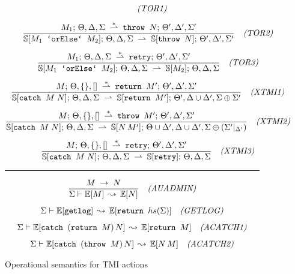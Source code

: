 \begin{figure*}
{\begin{minipage}{\textwidth}
\begin{gather*}
    \quad\soslbl{TOR1}
\\[5pt]
\sos{M_1;\,\Theta,\Delta\new{,\Sigma} \stackrel{*}{\tddarrow} 
      \prg{throw }N;\,\Theta',\Delta'\new{,\Sigma'}}
      {\SS[M_1 \prg{ `orElse` } M_2];\,\Theta,\Delta\new{,\Sigma} \tddarrow 
      \SS[\prg{throw }N];\,\Theta',\Delta'\new{,\Sigma'}} 
    \quad\soslbl{TOR2}
\\[5pt]
\sos{M_1;\,\Theta,\Delta\new{,\Sigma} \stackrel{*}{\tddarrow} 
      \prg{retry};\,\Theta',\Delta'\new{,\Sigma'}}
      {\SS[M_1 \prg{ `orElse` } M_2];\,\Theta,\Delta\new{,\Sigma} \tddarrow 
      \SS[M_2];\,\Theta,\Delta\new{,\Sigma}} 
    \quad\soslbl{TOR3}
\\[5pt]
%
%
\sos{M;\,\Theta,\emptyset\new{,[]}
     \stackrel{*}{\tddarrow}
     \prg{return }M';\, \Theta', \Delta'\new{,\Sigma'}}
    {\SS[\prg{catch }M\;N];\,\Theta,\Delta\new{,\Sigma} \tddarrow
     \SS[\prg{return }M'];\, \Theta',\Delta\cup\Delta'\new{,\Sigma\oplus\Sigma'}}
    \quad\soslbl{XTMI1}
\\[5pt]
\sos{M;\,\Theta,\emptyset\new{,[]}
     \stackrel{*}{\tddarrow}
     \prg{throw }M';\, \Theta', \Delta'\new{, \Sigma'}}
    {\SS[\prg{catch }M\;N];\,\Theta,\Delta\new{,\Sigma} \tddarrow
     \SS[N \,M'];\, \Theta\cup\Delta',\Delta\cup\Delta'\new{,\Sigma\oplus(\Sigma'|_{\Delta'})}}
    \quad\soslbl{XTMI2}
\\[5pt]
\sos{M;\,\Theta,\emptyset\new{,[]}
     \stackrel{*}{\tddarrow}
     \prg{retry};\, \Theta', \Delta'\new{, \Sigma'}}
    {\SS[\prg{catch }M\;N];\,\Theta,\Delta\new{,\Sigma} \tddarrow
     \SS[\prg{retry}];\, \Theta,\Delta\new{,\Sigma}}
    \quad\soslbl{XTMI3}
\end{gather*}

\rule{0.95\linewidth}{0.33pt}

\begin{gather*}
\frac{M\;\rightarrow\; N}{\Sigma \vdash \mathbb{E}[M] \,\leadsto\, \mathbb{E}[N]}
\quad\textit{(AUADMIN)}
\\[0.5em]
\Sigma \vdash \mathbb{E}[\texttt{getlog}] \,\leadsto\, \mathbb{E}[\texttt{return } hs(\Sigma)]
\quad\textit{(GETLOG)}
\\[0.5em]
\Sigma \vdash \mathbb{E}[\texttt{catch }(\texttt{return }M)\, N]
    \,\leadsto\,
    \mathbb{E}[\texttt{return } M]
    \quad\textit{(ACATCH1)}
\\[0.5em]
\Sigma \vdash \mathbb{E}[\texttt{catch }(\texttt{throw }M)\, N]
    \,\leadsto\,
    \mathbb{E}[N\,M]
    \quad\textit{(ACATCH2)}
\end{gather*}

\end{minipage}}
\caption{Operational semantics for TMI actions}
\label{fig:sos2}
\end{figure*}
